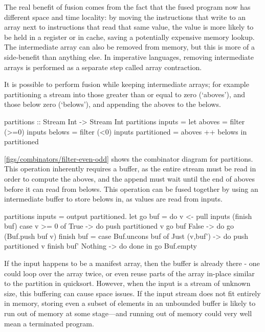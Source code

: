 The real benefit of fusion comes from the fact that the fused program now has different space and time locality: by moving the instructions that write to an array next to instructions that read that same value, the value is more likely to be held in a register or in cache, saving a potentially expensive memory lookup.
The intermediate array can also be removed from memory, but this is more of a side-benefit than anything else.
In imperative languages, removing intermediate arrays is performed as a separate step called array contraction.

It is possible to perform fusion while keeping intermediate arrays; for example partitioning a stream into those greater than or equal to zero (`aboves'), and those below zero (`belows'), and appending the aboves to the belows.

\begin{code}
partitions :: Stream Int -> Stream Int
partitions inputs =
 let aboves      = filter (>=0) inputs
     belows      = filter  (<0) inputs
     partitioned = aboves ++ belows
 in  partitioned
\end{code}


\autoref{figs/combinators/filter-even-odd} shows the combinator diagram for partitions.
This operation inherently requires a buffer, as the entire stream must be read in order to compute the aboves, and the append must wait until the end of aboves before it can read from belows.
This operation can be fused together by using an intermediate buffer to store belows in, as values are read from inputs.

\begin{code}
partitions inputs =
 output partitioned.
 let go buf = do
       v <- pull inputs (finish buf)
       case v >= 0 of
        True -> do
         push partitioned v
         go buf
        False -> do
         go (Buf.push buf v)
     finish buf = case Buf.uncons buf of
       Just (v,buf') -> do
         push partitioned v
         finish buf'
       Nothing -> do
         done
 in  go Buf.empty
\end{code}

If the input happens to be a manifest array, then the buffer is already there - one could loop over the array twice, or even reuse parts of the array in-place similar to the partition in quicksort.
However, when the input is a stream of unknown size, this buffering can cause space issues.
If the input stream does not fit entirely in memory, storing even a subset of elements in an unbounded buffer is likely to run out of memory at some stage---and running out of memory could very well mean a terminated program.

